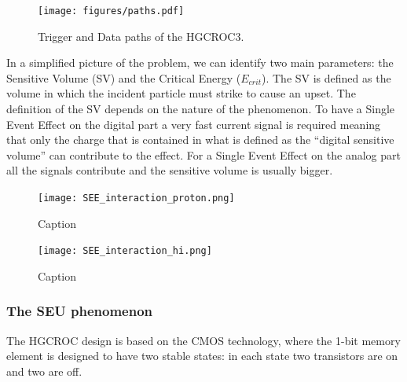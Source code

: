 \begin{figure}
    \centering
    \texttt{[image: figures/paths.pdf]}
    \caption{Trigger and Data paths of the HGCROC3.}
    \label{fig:paths}
\end{figure}



















In a simplified picture of the problem, we can identify two main parameters: the Sensitive Volume (SV) and the Critical Energy ($E_{crit}$).
The SV is defined as the volume in which the incident particle must strike to cause an upset. The definition of the SV depends on the nature of the phenomenon.
To have a Single Event Effect on the digital part a very fast current signal is required meaning that only the charge that is contained in what is defined as the “digital sensitive volume” can contribute to the effect. For a Single Event Effect on the analog part all the signals contribute and the sensitive volume is usually bigger.

\begin{figure}
    \begin{minipage}{0.48\textwidth}\centering
         \texttt{[image: SEE\_interaction\_proton.png]}
         \caption{Caption}
         \label{Fig:Data1}
    \end{minipage}
    \begin{minipage}{0.48\textwidth}\centering
         \texttt{[image: SEE\_interaction\_hi.png]}
         \caption{Caption}
         \label{Fig:Data1}
    \end{minipage}
\end{figure}


\subsubsection*{The SEU phenomenon}

The HGCROC design is based on the CMOS technology, where the 1-bit memory element is designed to have two stable states: in each state two transistors are on and two are off.




















